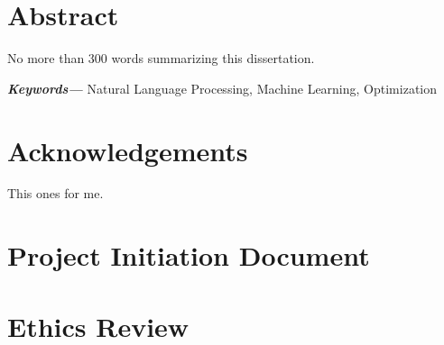 \documentclass[12pt, a4paper]{report}
\providecommand{\keywords}[1]
{
  \small
  \textbf{\textit{Keywords---}} #1
}
\begin{document}
\chapter*{Abstract}	%

No more than 300 words summarizing this dissertation.

\indent\keywords{Natural Language Processing, Machine Learning, Optimization}

\newpage
\renewcommand{\contentsname}{Table of Contents}	%
\tableofcontents

\newpage
{}	%
\listoftables

\newpage
{}	%
\listoffigures


\newpage

{}
\chapter*{Acknowledgements}
This ones for me.
\newpage





% 
% 













\begin{appendices}
  \newpage

  \chapter{Project Initiation Document}
  

  \chapter{Ethics Review}
\end{appendices}

\newpage
{}
{}
\printbibliography
\end{document}
